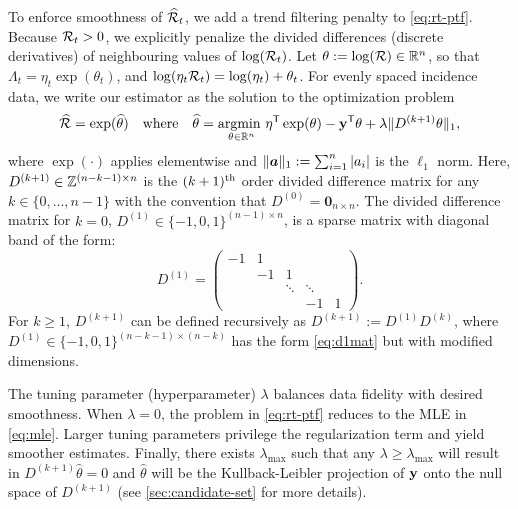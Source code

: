 To enforce smoothness of $\widehat{\mathcal{R}}_t$, we add a trend filtering penalty 
\citep{kim2009ell_1, tibshirani2014adaptive, tibshirani2022divided, sadhanala2024exponential} 
to \eqref{eq:rt-ptf}. Because $\mathcal{R}_t > 0$,
we explicitly penalize the divided differences (discrete derivatives) of
neighbouring values of $\log(\mathcal{R}_t)$. 
Let $\theta := \log(\mathcal{R}) \in \mathbb{R}^n$, so that $\Lambda_t =
\eta_t \exp(\theta_t)$, and $\log(\eta_t \mathcal{R}_t) = \log(\eta_t) +
\theta_t$. For evenly spaced incidence data, we
write our estimator as the solution to the optimization problem
\begin{equation} 
  \label{eq:rt-ptf}
  \widehat{\mathcal{R}} = \exp(\widehat{\theta}) \quad\textrm{where}\quad \widehat{\theta} 
  = \underset{\theta\in\mathbb{R}^n}{\operatorname*{argmin}\ } \eta^{\mathsf{T}} \exp(\theta) - \mathbf{y}^{\mathsf{T}} \theta + \lambda 
  \lVert D^{(k+1)} \theta \rVert_1,
\end{equation}
where $\exp(\cdot)$ applies elementwise and $\lVert \boldsymbol{a} \rVert_1 :=
\sum_{i=1}^n |a_i|$ is the $\ell_1$ norm. Here, $D^{(k+1)} \in
\mathbb{Z}^{(n-k-1)\times n}$ is the $(k+1)^{\textnormal{th}}$ order divided difference matrix for
any $k \in \{0,\ldots,n-1\}$ with the convention that $D^{(0)} = \mathbf{0}_{n
\times n}$. The divided difference matrix for $k=0$, $D^{(1)} \in \{-1,0,1\}^{(n-1)\times n}$, is a sparse matrix with diagonal band of
the form:
\begin{equation} 
  \label{eq:d1mat}
  D^{(1)} = 
  \begin{pmatrix} 
    -1 & 1 &  & & \\ 
    & -1 & 1 & & \\ 
    & & \ddots & \ddots & \\
    & & & -1 & 1 
  \end{pmatrix}.
\end{equation}
For $k\geq 1$, $D^{(k+1)}$ can be defined recursively as $D^{(k+1)} := D^{(1)}
D^{(k)}$, where $D^{(1)} \in \{-1,0,1\}^{(n-k-1)\times (n-k)}$ has the form
\eqref{eq:d1mat} but with modified dimensions.

The tuning parameter (hyperparameter) $\lambda$ balances data
fidelity with desired smoothness. When $\lambda=0$, the problem in
\eqref{eq:rt-ptf} reduces to the MLE in \eqref{eq:mle}. Larger tuning parameters
privilege the regularization term and yield smoother estimates. Finally, there
exists $\lambda_{\textrm{max}}$ such that any $\lambda \geq
\lambda_{\textrm{max}}$ will result in $D^{(k+1)} \widehat {\theta} = 0$ and
$\widehat{\theta}$ will be the Kullback-Leibler projection of $\mathbf{y}$ onto the
null space of $D^{(k+1)}$ (see \autoref{sec:candidate-set} for more details).

